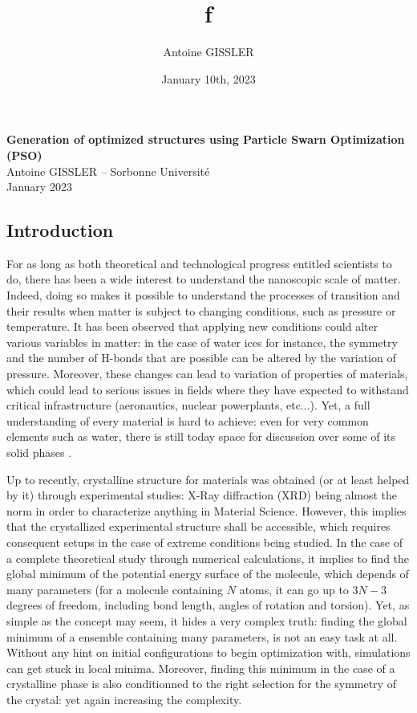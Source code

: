 \documentclass[11pt]{article}
\title{\textsf{\textbf{f}}}
\author{Antoine GISSLER}
\date{January 10th, 2023}
\begin{document}
\noindent\huge\textbf{\textsf{Generation of optimized structures using Particle Swarn Optimization (PSO)}}\normalsize\vspace{1em}\\
\large \textsf{Antoine GISSLER -- Sorbonne Université\\January 2023}
\begin{multicols}{2}
\section*{Introduction}

For as long as both theoretical and technological progress entitled scientists to do, there has been a wide interest to understand the nanoscopic scale of matter. Indeed, doing so makes it possible to understand the processes of transition and their results when matter is subject to changing conditions, such as pressure or temperature. It has been observed that applying new conditions could alter various variables in matter: in the case of water ices for instance, the symmetry and the number of H-bonds that are possible can be altered by the variation of pressure. Moreover, these changes can lead to variation of properties of materials, which could lead to serious issues in fields where they have expected to withstand critical infrastructure (aeronautics, nuclear powerplants, etc...). Yet, a full understanding of every material is hard to achieve: even for very common elements such as water, there is still today space for discussion over some of its solid phases \cite{Hansen2021-bk}.

Up to recently, crystalline structure for materials was obtained (or at least helped by it) through experimental studies: X-Ray diffraction (XRD) being almost the norm in order to characterize anything in Material Science. However, this implies that the crystallized experimental structure shall be accessible, which requires consequent setups in the case of extreme conditions being studied. In the case of a complete theoretical study through numerical calculations, it implies to find the global minimum of the potential energy surface of the molecule, which depends of many parameters (for a molecule containing $N$ atoms, it can go up to $3N-3$ degrees of freedom, including bond length, angles of rotation and torsion). Yet, as simple as the concept may seem, it hides a very complex truth: finding the global minimum of a ensemble containing many parameters, is not an easy task at all. Without any hint on initial configurations to begin optimization with, simulations can get stuck in local minima. Moreover, finding this minimum in the case of a crystalline phase is also conditionned to the right selection for the symmetry of the crystal: yet again increasing the complexity.\vspace{1em}


\end{multicols}
\end{document}
